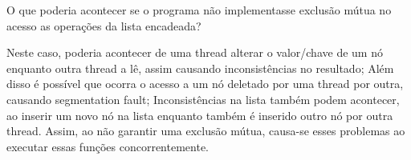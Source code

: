 \question O que poderia acontecer se o programa não implementasse exclusão mútua no
acesso as operações da lista encadeada?
\begin{solution}
    Neste caso, poderia acontecer de uma thread alterar o valor/chave de um nó enquanto outra thread a lê, assim causando inconsistências no resultado; Além disso é possível que ocorra o acesso a um nó deletado por uma thread por outra, causando segmentation fault; Inconsistências na lista também podem acontecer, ao inserir um novo nó na lista enquanto também é inserido outro nó por outra thread. Assim, ao não garantir uma exclusão mútua, causa-se esses problemas ao executar essas funções concorrentemente.
\end{solution}
